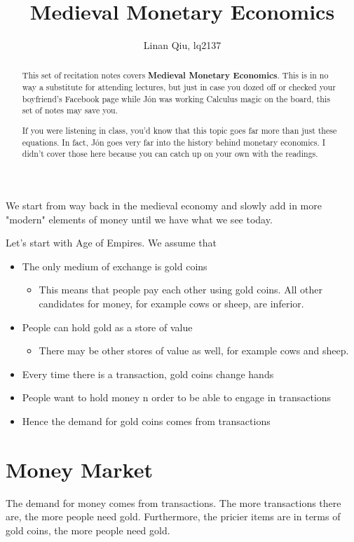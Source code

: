 \documentclass[11pt]{scrartcl}
\title{Medieval Monetary Economics}
\author{Linan Qiu, lq2137}
\newcommand{\jon}{J\'{o}n }
\begin{document}
\maketitle

\begin{abstract}
This set of recitation notes covers \textbf{Medieval Monetary Economics}. This is in no way a substitute for attending lectures, but just in case you dozed off or checked your boyfriend's Facebook page while \jon was working Calculus magic on the board, this set of notes may save you.

If you were listening in class, you'd know that this topic goes far more than just these equations. In fact, \jon goes very far into the history behind monetary economics. I didn't cover those here because you can catch up on your own with the readings.
\end{abstract}

We start from way back in the medieval economy and slowly add in more "modern" elements of money until we have what we see today.

Let's start with Age of Empires. We assume that

\begin{itemize}
\item The only medium of exchange is gold coins
\begin{itemize}
\item This means that people pay each other using gold coins. All other candidates for money, for example cows or sheep, are inferior.
\end{itemize}
\item People can hold gold as a store of value
\begin{itemize}
\item There may be other stores of value as well, for example cows and sheep.
\end{itemize}
\item Every time there is a transaction, gold coins change hands
\item People want to hold money n order to be able to engage in transactions
\item Hence the demand for gold coins comes from transactions
\end{itemize}

\section{Money Market}

The demand for money comes from transactions. The more transactions there are, the more people need gold. Furthermore, the pricier items are in terms of gold coins, the more people need gold. 
\end{document}
